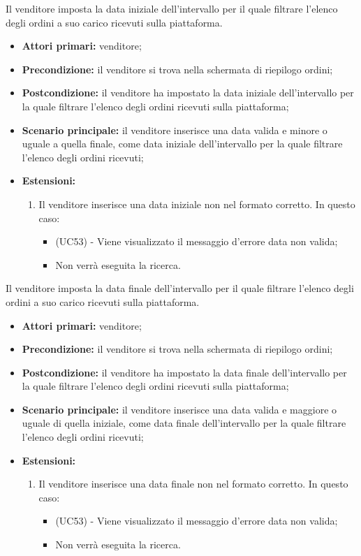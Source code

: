 Il venditore imposta la data iniziale dell'intervallo per il quale filtrare l'elenco degli ordini a suo carico ricevuti sulla piattaforma.
\begin{itemize}
	\item \textbf{Attori primari:} venditore;
	\item \textbf{Precondizione:} il venditore si trova nella schermata di riepilogo ordini;
	\item \textbf{Postcondizione:} il venditore ha impostato la data iniziale dell'intervallo per la quale filtrare l'elenco degli ordini ricevuti sulla piattaforma;
	\item \textbf{Scenario principale:} il venditore inserisce una data valida e minore o uguale a quella finale, come data iniziale dell'intervallo per la quale filtrare l'elenco degli ordini ricevuti;
	\item \textbf{Estensioni:}
	\begin{enumerate}[label=\lett]
		\item Il venditore inserisce una data iniziale non nel formato corretto. In questo caso:
		\begin{itemize}
			\item (UC53) - Viene visualizzato il messaggio d'errore data non valida;
			\item Non verrà eseguita la ricerca.
		\end{itemize} 
	\end{enumerate}
\end{itemize}

Il venditore imposta la data finale dell'intervallo per il quale filtrare l'elenco degli ordini a suo carico ricevuti sulla piattaforma.
\begin{itemize}
	\item \textbf{Attori primari:} venditore;
	\item \textbf{Precondizione:} il venditore si trova nella schermata di riepilogo ordini;
	\item \textbf{Postcondizione:} il venditore ha impostato la data finale dell'intervallo per la quale filtrare l'elenco degli ordini ricevuti sulla piattaforma;
	\item \textbf{Scenario principale:} il venditore inserisce una data valida e maggiore o uguale di quella iniziale, come data finale dell'intervallo per la quale filtrare l'elenco degli ordini ricevuti;
	\item \textbf{Estensioni:}
	\begin{enumerate}[label=\lett]
		\item Il venditore inserisce una data finale non nel formato corretto. In questo caso:
		\begin{itemize}
			\item (UC53) - Viene visualizzato il messaggio d'errore data non valida;
			\item Non verrà eseguita la ricerca.
		\end{itemize}
	\end{enumerate}
\end{itemize}